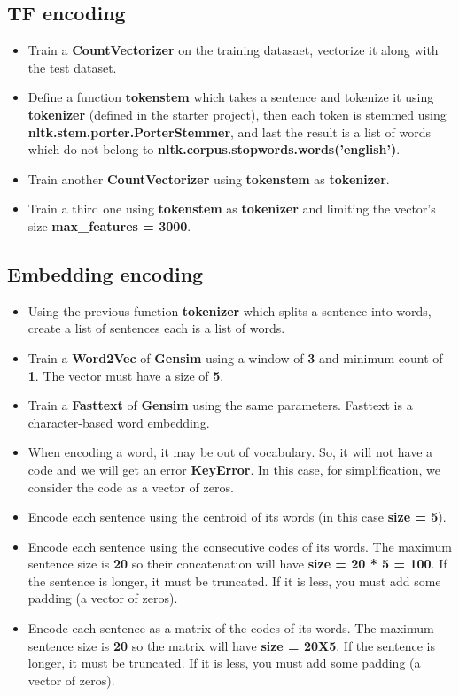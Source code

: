 \documentclass{../extra/aakpract/aakpract}
\begin{document}
\subsection{TF encoding}

\begin{itemize}
	\item Train a \textbf{CountVectorizer} on the training datasaet, vectorize it along with the test dataset. 
	\item Define a function \textbf{tokenstem} which takes a sentence and tokenize it using \textbf{tokenizer} (defined in the starter project), then each token is stemmed using \textbf{nltk.stem.porter.PorterStemmer}, and last the result is a list of words which do not belong to \textbf{nltk.corpus.stopwords.words('english')}.
	\item Train another \textbf{CountVectorizer} using  \textbf{tokenstem} as \textbf{tokenizer}. 
	\item Train a third one using  \textbf{tokenstem} as \textbf{tokenizer} and limiting the vector's size \textbf{max\_features = 3000}.
\end{itemize}

\subsection{Embedding encoding}

\begin{itemize}
	\item Using the previous function \textbf{tokenizer} which splits a sentence into words, create a list of sentences each is a list of words.	
	\item Train a \textbf{Word2Vec} of \textbf{Gensim} using a window of \textbf{3} and minimum count of \textbf{1}.
	The vector must have a size of \textbf{5}.
	\item Train a \textbf{Fasttext} of \textbf{Gensim} using the same parameters. Fasttext is a character-based word embedding.
	\item When encoding a word, it may be out of vocabulary. So, it will not have a code and we will get an error \textbf{KeyError}.
	In this case, for simplification, we consider the code as a vector of zeros.
	\item Encode each sentence using the centroid of its words (in this case \textbf{size = 5}).
	\item Encode each sentence using the consecutive codes of its words. 
	The maximum sentence size is \textbf{20} so their concatenation will have \textbf{size = 20 * 5 = 100}. 
	If the sentence is longer, it must be truncated.
	If it is less, you must add some padding (a vector of zeros).
	\item Encode each sentence as a matrix of the codes of its words.
	The maximum sentence size is \textbf{20} so the matrix will have \textbf{size = 20X5}.
	If the sentence is longer, it must be truncated.
	If it is less, you must add some padding (a vector of zeros).
\end{itemize}
\end{document}
